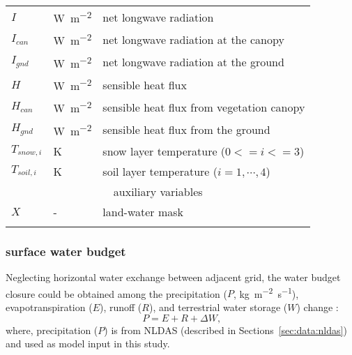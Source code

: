 \documentclass[essd]{copernicus}
\begin{document}
\begin{table}[t]
\begin{tabular}{lll}
        $I$          & \unit{W~m^{-2}}         & net longwave radiation                    \\
        $I_{can}$    & \unit{W~m^{-2}}         & net longwave radiation at the canopy      \\
        $I_{gnd}$    & \unit{W~m^{-2}}         & net longwave radiation at the ground      \\
        $H$          & \unit{W~m^{-2}}         & sensible heat flux                        \\
        $H_{can}$    & \unit{W~m^{-2}}         & sensible heat flux from vegetation canopy \\
        $H_{gnd}$    & \unit{W~m^{-2}}         & sensible heat flux from the ground        \\
        $T_{snow,i}$ & \unit{K}                & snow layer temperature ($0<=i<=3$)        \\
        $T_{soil,i}$ & \unit{K}                & soil layer temperature ($i=1,\cdots,4$)   \\
        [1pt]
        \multicolumn{3}{c}{auxiliary variables}                                            \\
        $X$          & \unit{-}                & land-water mask                           \\
        \bottomhline
    \end{tabular}
\end{table}


\subsubsection{surface water budget}

Neglecting horizontal water exchange between adjacent grid, the water budget closure could be obtained among the precipitation ($P$, \unit{kg~m^{-2}~s^{-1}}), evapotranspiration ($E$), runoff ($R$), and terrestrial water storage ($W$) change \citep{zheng2020JAMES}:
\begin{equation}
    P = E + R + \Delta W \text{,}
\end{equation}
where, precipitation ($P$) is from NLDAS (described in Sections~\ref{sec:data:nldas}) and used as model input in this study.
\end{document}
